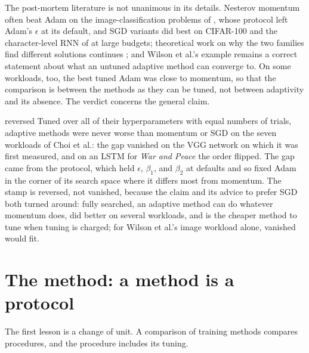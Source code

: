 \begin{refsection}
The post-mortem literature is not unanimous in its details. Nesterov momentum often beat Adam on the image-classification problems of \textcite{SchmidtEtAl2021}, whose protocol left Adam's $\epsilon$ at its default, and SGD variants did best on CIFAR-100 and the character-level RNN of \textcite{SivaprasadEtAl2020} at large budgets; theoretical work on why the two families find different solutions continues \parencite{ZhouEtAl2020}; and Wilson et al.'s example remains a correct statement about what an untuned adaptive method can converge to. On some workloads, too, the best tuned Adam was close to momentum, so that the comparison is between the methods as they can be tuned, not between adaptivity and its absence. The verdict concerns the general claim.

\begin{verdict}{reversed}
Tuned over all of their hyperparameters with equal numbers of trials, adaptive methods were never worse than momentum or SGD on the seven workloads of Choi et al.: the gap vanished on the VGG network on which it was first measured, and on an LSTM for \emph{War and Peace} the order flipped. The gap came from the protocol, which held $\epsilon$, $\beta_1$, and $\beta_2$ at defaults and so fixed Adam in the corner of its search space where it differs most from momentum. The stamp is reversed, not vanished, because the claim and its advice to prefer SGD both turned around: fully searched, an adaptive method can do whatever momentum does, did better on several workloads, and is the cheaper method to tune when tuning is charged; for Wilson et al.'s image workload alone, vanished would fit.
\end{verdict}

\section{The method: a method is a protocol}\label{sec:budgets:method}

The first lesson is a change of unit. A comparison of training methods compares procedures, and the procedure includes its tuning.



\end{refsection}
